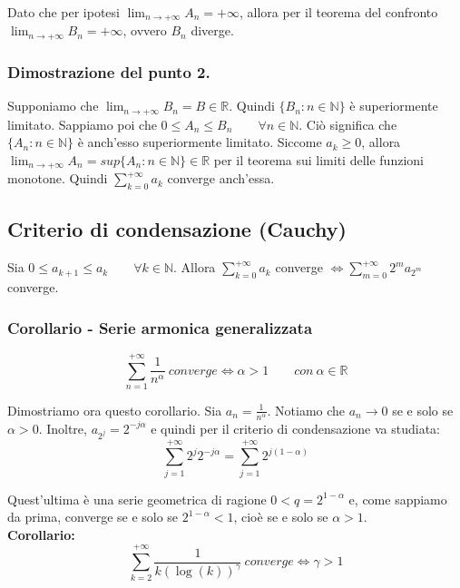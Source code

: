 \documentclass{article}
\begin{document}
\noindent Dato che per ipotesi $\lim_{n \to +\infty} A_n = +\infty$, allora per il teorema del confronto $\lim_{n \to +\infty} B_n = +\infty$, ovvero $B_n$ diverge. 

\subsubsection{Dimostrazione del punto 2.}
Supponiamo che $\lim_{n \to +\infty} B_n = B \in \mathbb{R}$. Quindi $\{B_n : n \in \mathbb{N}\}$ è superiormente limitato. Sappiamo poi che $0 \leq A_n \leq B_n \qquad \forall n \in \mathbb{N}$. Ciò significa che $\{A_n : n \in \mathbb{N}\}$ è anch'esso superiormente limitato. Siccome $a_k \geq 0$, allora $\lim_{n \to +\infty} A_n = sup\{A_n : n \in \mathbb{N}\} \in \mathbb{R}$ per il teorema sui limiti delle funzioni monotone. Quindi $\sum_{k = 0}^{+\infty} a_k$ converge anch'essa.

\subsection{Criterio di condensazione (Cauchy)}
Sia $0 \leq a_{k + 1} \leq a_k \qquad \forall k \in \mathbb{N}$. Allora $\sum_{k = 0}^{+\infty} a_k$ converge $\iff \sum_{m = 0}^{+\infty} 2^m a_{2^m}$ converge.

\subsubsection{Corollario - Serie armonica generalizzata}
\begin{equation*}
    \sum_{n = 1}^{+\infty} \frac{1}{n^\alpha} \ converge \iff \alpha > 1 \qquad con \ \alpha \in \mathbb{R}
\end{equation*}

\noindent Dimostriamo ora questo corollario. Sia $a_n = \frac{1}{n^\alpha}$. Notiamo che $a_n \to 0$ se e solo se $\alpha > 0$. Inoltre, $a_{2^j} = 2^{-j\alpha}$ e quindi per il criterio di condensazione va studiata:
\begin{equation*}
    \sum_{j = 1}^{+\infty}2^j 2^{-j\alpha} = \sum_{j = 1}^{+\infty} 2^{j(1 - \alpha)}
\end{equation*}

\noindent Quest'ultima è una serie geometrica di ragione $0 < q = 2^{1 - \alpha}$ e, come sappiamo da prima, converge se e solo se $2^{1 - \alpha} < 1$, cioè se e solo se $\alpha > 1$.\\

\noindent\textbf{Corollario:}
\begin{equation*}
    \sum_{k = 2}^{+\infty} \frac{1}{k(\log(k))^\gamma} \ converge \iff \gamma > 1
\end{equation*}
\end{document}
